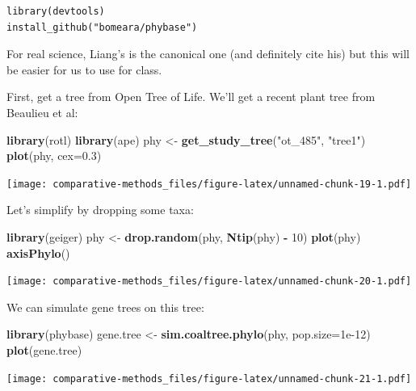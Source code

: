 \documentclass[]{article}
\newenvironment{Shaded}{\begin{snugshade}}{\end{snugshade}}
\newcommand{\DataTypeTok}[1]{\textcolor[rgb]{0.13,0.29,0.53}{#1}}
\newcommand{\DecValTok}[1]{\textcolor[rgb]{0.00,0.00,0.81}{#1}}
\newcommand{\FloatTok}[1]{\textcolor[rgb]{0.00,0.00,0.81}{#1}}
\newcommand{\KeywordTok}[1]{\textcolor[rgb]{0.13,0.29,0.53}{\textbf{#1}}}
\newcommand{\NormalTok}[1]{#1}
\newcommand{\OperatorTok}[1]{\textcolor[rgb]{0.81,0.36,0.00}{\textbf{#1}}}
\newcommand{\StringTok}[1]{\textcolor[rgb]{0.31,0.60,0.02}{#1}}
\begin{document}
\begin{verbatim}
library(devtools)
install_github("bomeara/phybase")
\end{verbatim}

For real science, Liang's is the canonical one (and definitely cite his) but this will be easier for us to use for class.

First, get a tree from Open Tree of Life. We'll get a recent plant tree from Beaulieu et al:

\begin{Shaded}
\begin{Highlighting}[]
\KeywordTok{library}\NormalTok{(rotl)}
\KeywordTok{library}\NormalTok{(ape)}
\NormalTok{phy <-}\StringTok{ }\KeywordTok{get_study_tree}\NormalTok{(}\StringTok{"ot_485"}\NormalTok{, }\StringTok{"tree1"}\NormalTok{)}
\KeywordTok{plot}\NormalTok{(phy, }\DataTypeTok{cex=}\FloatTok{0.3}\NormalTok{)}
\end{Highlighting}
\end{Shaded}

\texttt{[image: comparative-methods\_files/figure-latex/unnamed-chunk-19-1.pdf]}

Let's simplify by dropping some taxa:

\begin{Shaded}
\begin{Highlighting}[]
\KeywordTok{library}\NormalTok{(geiger)}
\NormalTok{phy <-}\StringTok{ }\KeywordTok{drop.random}\NormalTok{(phy, }\KeywordTok{Ntip}\NormalTok{(phy) }\OperatorTok{-}\StringTok{ }\DecValTok{10}\NormalTok{)}
\KeywordTok{plot}\NormalTok{(phy)}
\KeywordTok{axisPhylo}\NormalTok{()}
\end{Highlighting}
\end{Shaded}

\texttt{[image: comparative-methods\_files/figure-latex/unnamed-chunk-20-1.pdf]}

We can simulate gene trees on this tree:

\begin{Shaded}
\begin{Highlighting}[]
\KeywordTok{library}\NormalTok{(phybase)}
\NormalTok{gene.tree <-}\StringTok{ }\KeywordTok{sim.coaltree.phylo}\NormalTok{(phy, }\DataTypeTok{pop.size=}\FloatTok{1e-12}\NormalTok{)}
\KeywordTok{plot}\NormalTok{(gene.tree)}
\end{Highlighting}
\end{Shaded}

\texttt{[image: comparative-methods\_files/figure-latex/unnamed-chunk-21-1.pdf]}
\end{document}
